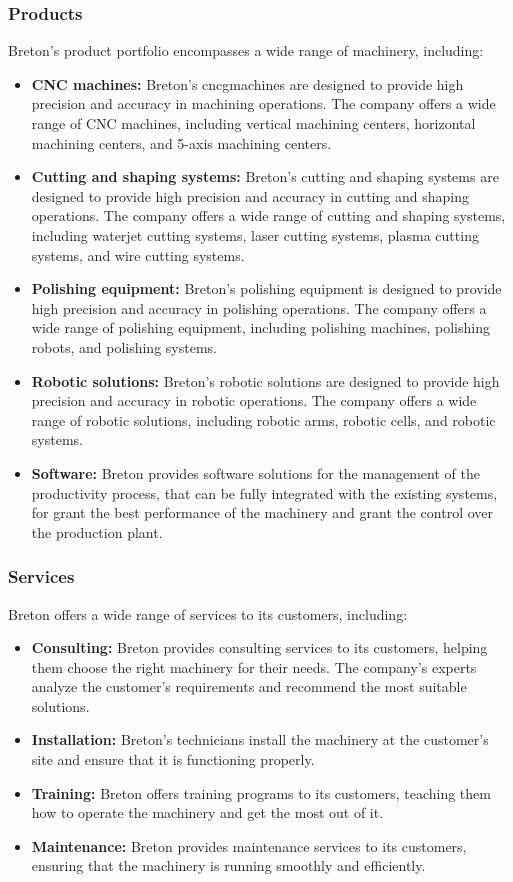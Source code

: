 \subsubsection{Products}
Breton's product portfolio encompasses a wide range of machinery, including:
\begin{itemize}
    \item \textbf{CNC machines:} Breton's \gls{cncg}\glsfirstoccur machines are designed to provide high precision and accuracy in machining operations. The company offers a wide range of CNC machines, including vertical machining centers, horizontal machining centers, and 5-axis machining centers.
    \item \textbf{Cutting and shaping systems:} Breton's cutting and shaping systems are designed to provide high precision and accuracy in cutting and shaping operations. The company offers a wide range of cutting and shaping systems, including waterjet cutting systems, laser cutting systems, plasma cutting systems, and wire cutting systems.
    \item \textbf{Polishing equipment:} Breton's polishing equipment is designed to provide high precision and accuracy in polishing operations. The company offers a wide range of polishing equipment, including polishing machines, polishing robots, and polishing systems.
    \item \textbf{Robotic solutions:} Breton's robotic solutions are designed to provide high precision and accuracy in robotic operations. The company offers a wide range of robotic solutions, including robotic arms, robotic cells, and robotic systems.
    \item \textbf{Software:} Breton provides software solutions for the management of the productivity process, that can be fully integrated with the existing systems, for grant the best performance of the machinery and grant the control over the production plant.
\end{itemize} 
\subsubsection{Services}
Breton offers a wide range of services to its customers, including:
\begin{itemize}
    \item \textbf{Consulting:} Breton provides consulting services to its customers, helping them choose the right machinery for their needs. The company's experts analyze the customer's requirements and recommend the most suitable solutions.
    \item \textbf{Installation:} Breton's technicians install the machinery at the customer's site and ensure that it is functioning properly.
    \item \textbf{Training:} Breton offers training programs to its customers, teaching them how to operate the machinery and get the most out of it.
    \item \textbf{Maintenance:} Breton provides maintenance services to its customers, ensuring that the machinery is running smoothly and efficiently.
\end{itemize}

